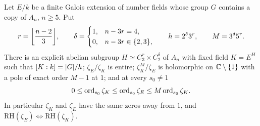 \begin{theorem}\label{nab:thm:lowdegree}
Let $E/k$ be a finite Galois extension of number fields whose group $G$ contains a copy of
$A_n$, $n\ge5$. Put
\[
 r=\floor*{\frac{n-2}3},\qquad
 \delta=\begin{cases}1,&n-3r=4,\\0,&n-3r\in\set{2,3},\end{cases}\qquad
 h=2^\delta3^r,\qquad M=3^\delta5^r .
\]
There is an explicit abelian subgroup $H\simeq C_3^r\times C_2^\delta$ of $A_n$ with fixed field
$K=E^H$ such that $[K:k]=\lvert G\rvert/h$; $\zeta_E/\zeta_K$ is entire; $\zeta_K^M/\zeta_E$ is holomorphic
on $\mathbb{C}\setminus\{1\}$ with a pole of exact order $M-1$ at $1$; and at every $s_0\ne1$
\[
 0\le\operatorname{ord}_{s_0}\zeta_K\le\operatorname{ord}_{s_0}\zeta_E\le M\operatorname{ord}_{s_0}\zeta_K .
\]
In particular $\zeta_K$ and $\zeta_E$ have the same zeros away from $1$, and
$\mathrm{RH}(\zeta_E)\Leftrightarrow\mathrm{RH}(\zeta_K)$.
\end{theorem}
